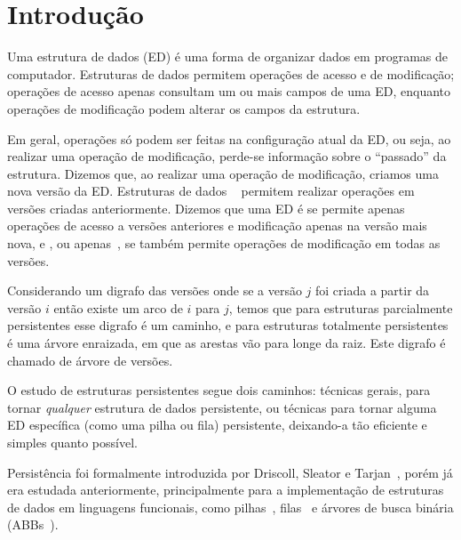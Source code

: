 \documentclass[main.tex]{subfiles}
\begin{document}
\setcounter{secnumdepth}{0}

\chapter*{Introdução}

Uma estrutura de dados (ED) é uma forma de organizar dados em programas de computador. Estruturas de dados permitem operações de acesso e de modificação; operações de acesso apenas consultam um ou mais campos de uma ED, enquanto operações de modificação podem alterar os campos da estrutura.

Em geral, operações só podem ser feitas na configuração atual da ED, ou seja, ao realizar uma operação de modificação, perde-se informação sobre o ``passado'' da estrutura. Dizemos que, ao realizar uma operação de modificação, criamos uma nova versão da ED. Estruturas de dados ~\cite{DriscollSST1989} permitem realizar operações em versões criadas anteriormente. Dizemos que uma ED é  se permite apenas operações de acesso a versões anteriores e modificação apenas na versão mais nova, e , ou apenas~, se também permite operações de modificação em todas as versões.

Considerando um digrafo das versões onde se a versão $j$ foi criada a partir da versão $i$ então existe um arco de $i$ para $j$, temos que para estruturas parcialmente persistentes esse digrafo é um caminho, e para estruturas totalmente persistentes é uma árvore enraizada, em que as arestas vão para longe da raiz. Este digrafo é chamado de árvore de versões.

O estudo de estruturas persistentes segue dois caminhos: técnicas gerais, para tornar \emph{qualquer} estrutura de dados persistente, ou técnicas para tornar alguma ED específica (como uma pilha ou fila) persistente, deixando-a tão eficiente e simples quanto possível.

Persistência foi formalmente introduzida por Driscoll, Sleator e Tarjan~\cite{DriscollSST1989}, porém já era estudada anteriormente, principalmente para a implementação de estruturas de dados em linguagens funcionais, como pilhas~\cite{Myers83}, filas~\cite{HoodMelville} e árvores de busca binária (ABBs~\cite{Myers82}).

\setcounter{secnumdepth}{1}
\end{document}
